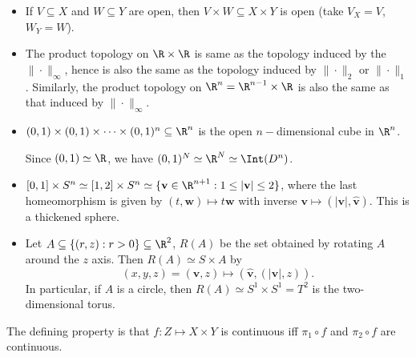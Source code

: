 \documentclass[a4paper]{article}
\begin{document}
\begin{eg}\leavevmode
  \begin{itemize}
    \item If $V\subseteq X$ and $W\subseteq Y$ are open, then $V\times W \subseteq X\times Y$ is open (take $V_X = V$, $W_Y = W$).
    \item The product topology on $\R\times \R$ is same as the topology induced by the $\|\cdot \|_\infty$, hence is also the same as the topology induced by $\|\cdot\|_2$ or $\|\cdot\|_1$. Similarly, the product topology on $\R^n = \R^{n - 1}\times \R$ is also the same as that induced by $\|\cdot\|_\infty$.
    \item $(0, 1) \times (0, 1)\times \cdots\times (0, 1)^n\subseteq \R^n$ is the open $n-$dimensional cube in $\R^n$.

      Since $(0, 1)\simeq \R$, we have $(0, 1)^N \simeq \R^N \simeq \Int(D^n)$.
    \item $[0, 1]\times S^n \simeq [1, 2] \times S^n\simeq \{\mathbf{v}\in \R^{n + 1}: 1 \leq |\mathbf{v}| \leq 2\}$, where the last homeomorphism is given by $(t, \mathbf{w}) \mapsto t\mathbf{w}$ with inverse $\mathbf{v} \mapsto (|\mathbf{v}|, \hat{\mathbf{v}})$. This is a thickened sphere.

    \item Let $A\subseteq \{(r, z): r > 0\} \subseteq \R^2$, $R(A)$ be the set obtained by rotating $A$ around the $z$ axis. Then $R(A) \simeq S\times A$ by
      \[
        (x, y, z) = (\mathbf{v}, z) \mapsto (\hat{\mathbf{v}}, (|\mathbf{v}|, z)).
      \]
    In particular, if $A$ is a circle, then $R(A) \simeq S^1\times S^1 = T^2$ is the two-dimensional torus.
      \begin{center}
      \end{center}

  \end{itemize}
\end{eg}
The defining property is that $f: Z\mapsto X\times Y$ is continuous iff $\pi_1\circ f$ and $\pi_2\circ f$ are continuous.
\end{document}

